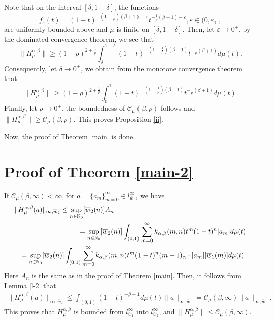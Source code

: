 \documentclass[10pt]{amsart}
\theoremstyle{definition}
\theoremstyle{question}
\numberwithin{equation}{section}
\begin{document}
Note that on the interval $[\delta, 1-\delta]$, the functions $$f_{\varepsilon}(t)=(1-t)^{-(1-\frac{1}{p})(\beta+1)+\varepsilon}t^{-\frac{1}{p}(\beta+1)-\varepsilon}, \varepsilon\in (0,\varepsilon_1],$$ are uniformly bounded above and $\mu$ is finite on $[\delta, 1-\delta]$. Then, let $\varepsilon \rightarrow 0^{+}$, by the dominated convergence theorem, we see that
\begin{equation}
\|H_{\mu}^{\alpha,\beta}\|\geq (1-\rho)^{2+\frac{1}{p}}\int_{\delta}^{1-\delta}(1-t)^{-(1-\frac{1}{p})(\beta+1)}t^{-\frac{1}{p}(\beta+1)}d\mu(t).\nonumber
\end{equation} 
Consequently, let $\delta\rightarrow 0^{+}$, we obtain from the monotone convergence theorem that  \begin{equation}
\|H_{\mu}^{\alpha,\beta}\|\geq (1-\rho)^{2+\frac{1}{p}}\int_{0}^{1}(1-t)^{-(1-\frac{1}{p})(\beta+1)}t^{-\frac{1}{p}(\beta+1)}d\mu(t).\nonumber
\end{equation}  Finally, let $\rho \rightarrow 0^{+}$, the boundedness of $\mathcal{C}_{\mu}(\beta, p)$ follows and $\|H_{\mu}^{\alpha,\beta}\|\geq \mathcal{C}_{\mu}(\beta, p)$. This proves Proposition \ref{ii}. 

Now, the proof of Theorem \ref{main} is done.

\section{{\bf Proof of Theorem \ref{main-2}}}
If $\mathcal{C}_{\mu}(\beta, \infty)<\infty$, for $a=\{a_m\}_{m=0}^{\infty}\in l_{\overline{w}_1}^{\infty}$, we have 
\begin{eqnarray}
\lefteqn{\|H_{\mu}^{\alpha, \beta}(a)\|_{\infty, \overline{w}_2}\leq \sup_{n\in \mathbb{N}_0}[\overline{w}_2(n)]A_n} \nonumber \\
&&= \sup_{n\in \mathbb{N}_0}[\overline{w}_2(n)] \int_{(0,1)}\sum_{m=0}^{\infty}k_{\alpha, \beta}(m,n)t^m (1-t)^n |a_m|d\mu(t)\nonumber \\
&&=  \sup_{n\in \mathbb{N}_0}[\overline{w}_2(n)] \int_{(0,1)}\sum_{m=0}^{\infty}k_{\alpha, \beta}(m,n)t^m (1-t)^n(m+1)_{\alpha}\cdot|a_m|[\overline{w}_1(m)]d\mu(t).\nonumber
\end{eqnarray}
Here $A_n$ is the same as in the proof of Theorem \ref{main}. Then, it follows from Lemma \ref{l-2} that
\begin{eqnarray}
\|H_{\mu}^{\alpha, \beta}(a)\|_{\infty, \overline{w}_2} \leq\int_{(0,1)}(1-t)^{-\beta-1}d\mu(t) \|a\|_{\infty, \overline{w}_1}=\mathcal{C}_{\mu}(\beta, \infty) \|a\|_{\infty, \overline{w}_1}.\nonumber 
\end{eqnarray}
This proves that $H_{\mu}^{\alpha, \beta}$ is bounded from $l_{\overline{w}_1}^{\infty}$ into $l_{\overline{w}_2}^{\infty}$, and $\|H_{\mu}^{\alpha, \beta}\|\leq \mathcal{C}_{\mu}(\beta, \infty).$
\end{document}

